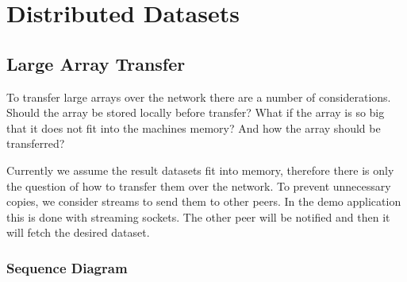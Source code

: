 \chapter{Distributed Datasets}
\label{cha:data}

\section{Large Array Transfer}
To transfer large arrays over the network there are a number of considerations. Should the array be stored locally before transfer?
What if the array is so big that it does not fit into the machines memory? And how the array should be transferred?

Currently we assume the result datasets fit into memory, therefore there is only the question of how 
to transfer them over the network. To prevent unnecessary copies, we consider streams to send them to
other peers. In the demo application this is done with streaming sockets. The other peer will be notified and then it will fetch the desired dataset.

\subsection{Sequence Diagram}

